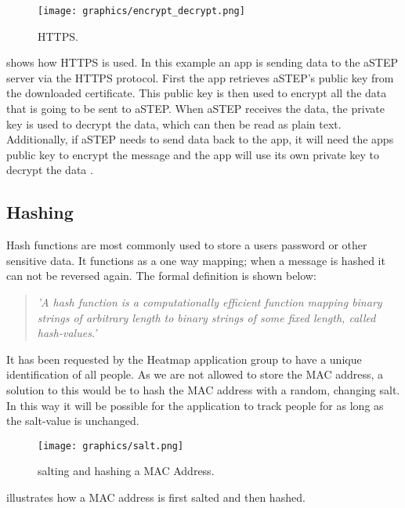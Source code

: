 \begin{figure}[ht]
	\begin{center}
		\texttt{[image: graphics/encrypt\_decrypt.png]}
		\caption{HTTPS.}
		\label{fig:HTTPS}
	\end{center} 
\end{figure}

 shows how HTTPS is used. In this example an app is sending data to the aSTEP server via the HTTPS protocol. First the app retrieves aSTEP's public key from the downloaded certificate. This public key is then used to encrypt all the data that is going to be sent to aSTEP. When aSTEP receives the data, the private key is used to decrypt the data, which can then be read as plain text. Additionally, if aSTEP needs to send data back to the app, it will need the apps public key to encrypt the message and the app will use its own private key to decrypt the data \cite{HTTPS}.

\subsection*{Hashing}
Hash functions are most commonly used to store a users password or other sensitive data. It functions as a one way mapping; when a message is hashed it can not be reversed again. The formal definition is shown below:
\begin{quote}
\textit{'A hash function is a computationally efficient function mapping binary strings of arbitrary length to binary strings of some fixed length, called hash-values.' \cite{Hash_def}}
\end{quote}

It has been requested by the Heatmap application group to have a unique identification of all people. As we are not allowed to store the MAC address, a solution to this would be to hash the MAC address with a random, changing salt. In this way it will be possible for the application to track people for as long as the salt-value is unchanged.

\begin{figure}[ht]
	\begin{center}
		\texttt{[image: graphics/salt.png]}
		\caption{salting and hashing a MAC Address.}
		\label{fig:salt}
	\end{center} 
\end{figure}

 illustrates how a MAC address is first salted and then hashed.


